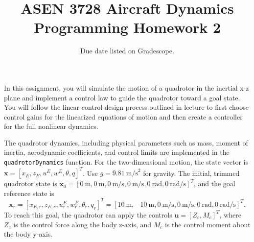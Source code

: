 \documentclass{article}
\title{ASEN 3728 Aircraft Dynamics\\Programming Homework 2}
\date{Due date listed on Gradescope.}
\theoremstyle{definition}
\begin{document}

\maketitle

In this assignment, you will simulate the motion of a quadrotor in the inertial x-z plane and implement a control law to guide the quadrotor toward a goal state. You will follow the linear control design process outlined in lecture to first choose control gains for the linearized equations of motion and then create a controller for the full nonlinear dynamics.

The quadrotor dynamics, including physical parameters such as mass, moment of inertia, aerodynamic coefficients, and control limits are implemented in the \texttt{quadrotorDynamics} function.
For the two-dimensional motion, the state vector is $\mathbf{x} = [x_E,z_E,u^E,w^E,\theta,q]^T$. Use $g=9.81 \ \text{m/s}^2$ for gravity. The initial, trimmed quadrotor state is $\mathbf{x}_0 = [0\ \text{m},0\ \text{m},0\ \text{m/s},0\ \text{m/s},0\ \text{rad},0\ \text{rad/s}]^T$, and the goal reference state is 
\begin{equation*}
    \mathbf{x}_r = [x_{E,r},z_{E,r},u^E_r,w^E_r,\theta_r,q_r]^T = [10\ \text{m},-10\ \text{m},0\ \text{m/s},0\ \text{m/s},0\ \text{rad},0\ \text{rad/s}]^T.
\end{equation*}
To reach this goal, the quadrotor can apply the controls $\mathbf{u} = [Z_c,M_c]^T$, where $Z_c$ is the control force along the body z-axis, and $M_c$ is the control moment about the body y-axis.
\end{document}
